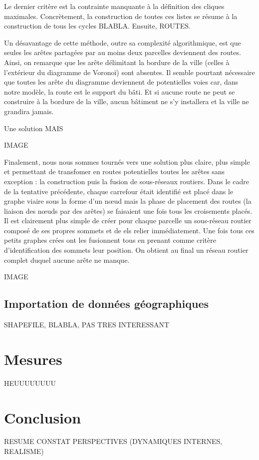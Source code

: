 \documentclass[10pt]{article}
\begin{document}
Le dernier critère est la contrainte manquante à la définition des
cliques maximales. Concrètement, la construction de toutes ces listes
se résume à la construction de tous les cycles BLABLA. Ensuite,
ROUTES.

Un désavantage de cette méthode, outre sa complexité algorithmique,
est que seules les arêtes partagées par au moins deux parcelles
deviennent des routes. Ainsi, on remarque que les arête délimitant la
bordure de la ville (celles à l'extérieur du diagramme de Voronoï)
sont absentes. Il semble pourtant nécessaire que toutes les arête du
diagramme deviennent de potentielles voies car, dans notre modèle, la
route est le support du bâti. Et si aucune route ne peut se construire
à la bordure de la ville, aucun bâtiment ne s'y installera et la ville
ne grandira jamais.

Une solution MAIS

IMAGE

Finalement, nous nous sommes tournés vers une solution plus claire,
plus simple et permettant de transfomer en routes potentielles toutes
les arêtes sans exception : la construction puis la fusion de
sous-réseaux routiers. Dans le cadre de la tentative précédente,
chaque carrefour était identifié est placé dans le graphe viaire sous
la forme d'un n\oe ud mais la phase de placement des routes (la
liaison des n\oe uds par des arêtes) se faisaient une fois tous les
croisements placés. Il est clairement plus simple de créer pour chaque
parcelle un sous-réseau routier composé de ses propres sommets et de
els relier immédiatement. Une fois tous ces petits graphes crées ont
les fusionnent tous en prenant comme critère d'identification des
sommets leur position. On obtient au final un réseau routier complet
duquel aucune arête ne manque.

IMAGE

\subsection{Importation de données géographiques}

SHAPEFILE, BLABLA, PAS TRES INTERESSANT

\section{Mesures}

HEUUUUUUUU

\section{Conclusion}

RESUME
CONSTAT
PERSPECTIVES (DYNAMIQUES INTERNES, REALISME)

\printbibliography
\end{document}
